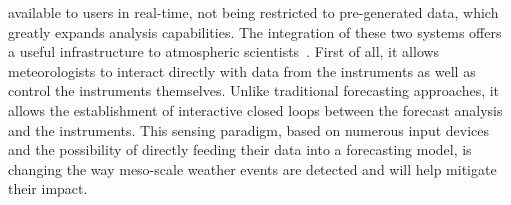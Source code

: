 available to users in real-time, not being restricted to pre-generated data, which greatly expands
analysis capabilities.
The integration of these two systems offers a useful infrastructure to atmospheric
scientists~\cite{casa-lead}.  First of all, it allows meteorologists to interact directly with data from
the instruments as well as control the instruments themselves. Unlike traditional forecasting
approaches, it allows the establishment of interactive closed loops between the forecast analysis and the
instruments. This sensing paradigm, based on numerous input devices and the possibility of directly
feeding their data into a forecasting model, is changing the way meso-scale weather events are detected
and will help mitigate their impact. 

